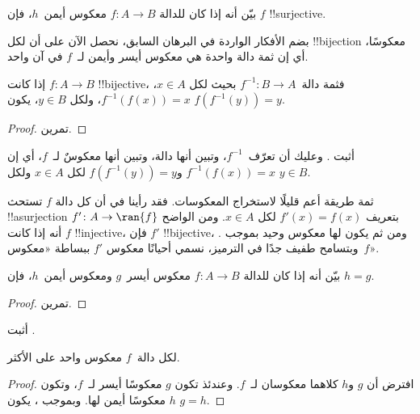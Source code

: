 \documentclass[../../../include/open-logic-section]{subfiles}
\begin{document}
\begin{prob}
بيّن أنه إذا كان للدالة $f\colon A \to B$ معكوس أيمن~$h$، فإن $f$
!!{surjective}.
\end{prob}

\begin{explain}
  بضم الأفكار الواردة في البرهان السابق، نحصل الآن على أن لكل
  !!{bijection} معكوسًا، أي إن ثمة دالة واحدة
  هي معكوس أيسر وأيمن لـ~$f$ في آن واحد.
\end{explain}

\begin{prop}
إذا كانت $f\colon A \to B$ !!{bijective}، فثمة
دالة~$f^{-1}\colon B \to A$ بحيث لكل $x \in A$،
$f^{-1}(f(x)) = x$، ولكل $y \in B$، يكون $f(f^{-1}(y)) = y$.
\end{prop}

\begin{proof}
تمرين.
\end{proof}

\begin{prob}
أثبت . وعليك أن
تعرّف~$f^{-1}$، وتبين أنها دالة، وتبين أنها
معكوسٌ لـ~$f$، أي إن $f^{-1}(f(x)) = x$ و$f(f^{-1}(y)) = y$ لكل
$x \in A$ ولكل $y \in B$.
\end{prob}

\begin{explain}
ثمة طريقة أعم قليلًا لاستخراج المعكوسات. فقد رأينا في
 أن كل دالة $f$ تستحث !!a{surjection} $f'
\colon A \to \ran{f}$ بتعريف $f'(x) = f(x)$ لكل $x \in A$.
ومن الواضح أنه إذا كانت $f$ !!{injective}، فإن $f'$ !!{bijective}، ومن ثم
يكون لها معكوس وحيد بموجب . وبتسامح طفيف جدًا
في الترميز، نسمي أحيانًا معكوس $f'$ ببساطة
«معكوس~$f$».
\end{explain}

\begin{prop}%
  بيّن أنه إذا كان للدالة $f\colon A \to B$ معكوس أيسر~$g$ ومعكوس
  أيمن~$h$، فإن $h = g$.
\end{prop}

\begin{proof}
  تمرين.
\end{proof}

\begin{prob}
  أثبت .
\end{prob}

\begin{prop}
لكل دالة~$f$ معكوس واحد على الأكثر.
\end{prop}

\begin{proof}
  افترض أن $g$ و$h$ كلاهما معكوسان لـ~$f$. وعندئذ تكون
  $g$ معكوسًا أيسر لـ~$f$، وتكون $h$ معكوسًا أيمن لها. وبموجب
  ، يكون $g = h$.
\end{proof}
\end{document}
